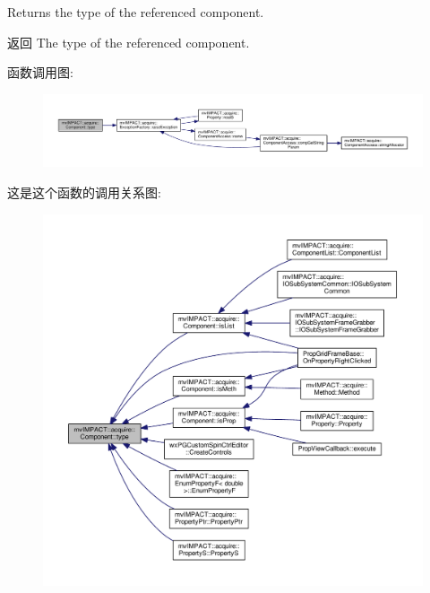 Returns the type of the referenced component. 

\begin{DoxyReturn}{返回}
The type of the referenced component. 
\end{DoxyReturn}


函数调用图\+:
\nopagebreak
\begin{figure}[H]
\begin{center}
\leavevmode
\includegraphics[width=350pt]{classmv_i_m_p_a_c_t_1_1acquire_1_1_component_a57b0745fbaeca5fb4cf3e35fd3143002_cgraph}
\end{center}
\end{figure}




这是这个函数的调用关系图\+:
\nopagebreak
\begin{figure}[H]
\begin{center}
\leavevmode
\includegraphics[width=350pt]{classmv_i_m_p_a_c_t_1_1acquire_1_1_component_a57b0745fbaeca5fb4cf3e35fd3143002_icgraph}
\end{center}
\end{figure}


